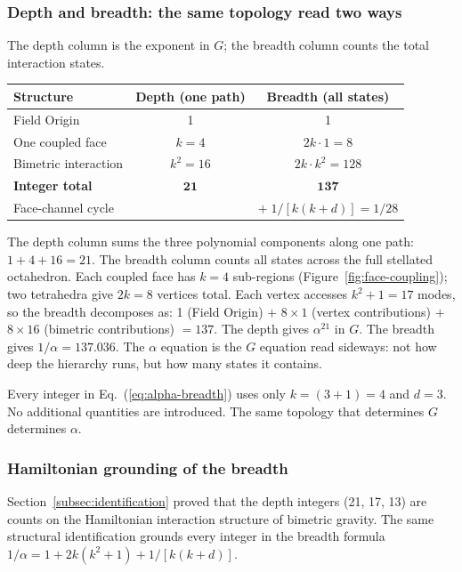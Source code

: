 \documentclass[aps,prd,preprint,superscriptaddress,showpacs,preprintnumbers,amsmath,amssymb,nofootinbib]{revtex4-2}
\begin{document}
\subsubsection*{Depth and breadth: the same topology read two ways}

The depth column is the exponent in $G$; the breadth column counts the total interaction states.

\begin{center}
\renewcommand{\arraystretch}{1.4}
\begin{tabular}{lcc}
\hline
\textbf{Structure} & \textbf{Depth (one path)} & \textbf{Breadth (all states)} \\
\hline
Field Origin & 1 & 1 \\
One coupled face & $k = 4$ & $2k \cdot 1 = 8$ \\
Bimetric interaction & $k^2 = 16$ & $2k \cdot k^2 = 128$ \\
\hline
\textbf{Integer total} & $\mathbf{21}$ & $\mathbf{137}$ \\
Face-channel cycle & & $+ \; 1/[k(k{+}d)] = 1/28$ \\
\hline
\end{tabular}
\end{center}

\noindent
The depth column sums the three polynomial components along one path: $1 + 4 + 16 = 21$. The breadth column counts all states across the full stellated octahedron. Each coupled face has $k = 4$ sub-regions (Figure~\ref{fig:face-coupling}); two tetrahedra give $2k = 8$ vertices total. Each vertex accesses $k^2 + 1 = 17$ modes, so the breadth decomposes as: 1 (Field Origin) $+$ $8 \times 1$ (vertex contributions) $+$ $8 \times 16$ (bimetric contributions) $= 137$. The depth gives $\alpha^{21}$ in $G$. The breadth gives $1/\alpha = 137.036$. The $\alpha$ equation is the $G$ equation read sideways: not how deep the hierarchy runs, but how many states it contains.

Every integer in Eq.~(\ref{eq:alpha-breadth}) uses only $k = (3{+}1) = 4$ and $d = 3$. No additional quantities are introduced. The same topology that determines $G$ determines $\alpha$.

\subsubsection*{Hamiltonian grounding of the breadth}

Section~\ref{subsec:identification} proved that the depth integers (21, 17, 13) are counts on the Hamiltonian interaction structure of bimetric gravity. The same structural identification grounds every integer in the breadth formula $1/\alpha = 1 + 2k(k^2 + 1) + 1/[k(k{+}d)]$.
\end{document}
